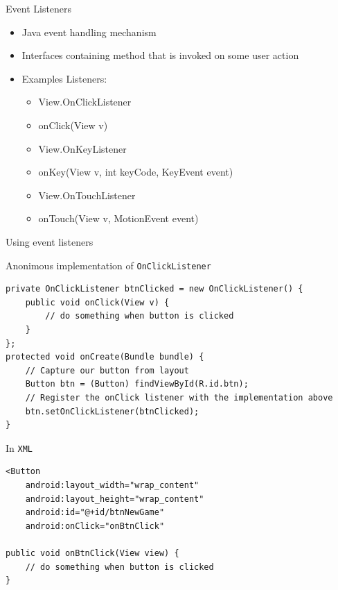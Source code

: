 \begin{frame}{Event Listeners}
\begin{itemize}
  \item Java event handling mechanism
  \item Interfaces containing method that is invoked on some user action
  \item Examples Listeners:
  \begin{itemize}
  \item View.OnClickListener
  \item onClick(View v)
  \item View.OnKeyListener
  \item onKey(View v, int keyCode, KeyEvent event)
  \item View.OnTouchListener
  \item onTouch(View v, MotionEvent event)
  \end{itemize}
\end{itemize}
\end{frame}

\begin{frame}[fragile,shrink=20]{Using event listeners}
\begin{exampleblock}{Anonimous implementation of \texttt{OnClickListener}}
\begin{lstlisting}
private OnClickListener btnClicked = new OnClickListener() {
    public void onClick(View v) {
        // do something when button is clicked
    }
};
protected void onCreate(Bundle bundle) {
    // Capture our button from layout
    Button btn = (Button) findViewById(R.id.btn);
    // Register the onClick listener with the implementation above
    btn.setOnClickListener(btnClicked);
}
\end{lstlisting}
\end{exampleblock}
\begin{exampleblock}{In \texttt{XML}}
\begin{lstlisting}
<Button
    android:layout_width="wrap_content"
    android:layout_height="wrap_content"
    android:id="@+id/btnNewGame"
    android:onClick="onBtnClick"
    
public void onBtnClick(View view) {
    // do something when button is clicked
}
\end{lstlisting}
\end{exampleblock}
\end{frame}

